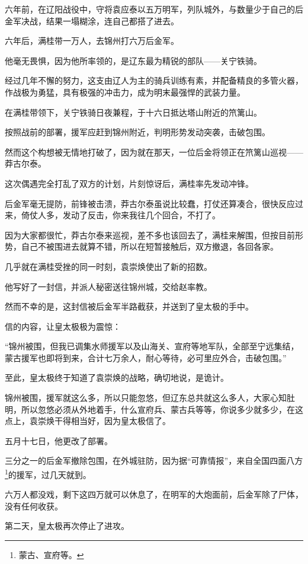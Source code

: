 \begin{multicols}{\theparacolNo}
		六年前，在辽阳战役中，守将袁应泰以五万明军，列队城外，与数量少于自己的后金军决战，结果一塌糊涂，连自己都搭了进去。

		六年后，满桂带一万人，去锦州打六万后金军。

		他毫无畏惧，因为他所率领的，是辽东最为精锐的部队——关宁铁骑。

		经过几年不懈的努力，这支由辽人为主的骑兵训练有素，并配备精良的多管火器，作战极为勇猛，具有极强的冲击力，成为明末最强悍的武装力量。

		在满桂带领下，关宁铁骑日夜兼程，于十六日抵达塔山附近的笊篱山。

		按照战前的部署，援军应赶到锦州附近，判明形势发动突袭，击破包围。

		然而这个构想被无情地打破了，因为就在那天，一位后金将领正在笊篱山巡视——莽古尔泰。

		这次偶遇完全打乱了双方的计划，片刻惊讶后，满桂率先发动冲锋。

		后金军毫无提防，前锋被击溃，莽古尔泰虽说比较蠢，打仗还算凑合，很快反应过来，倚仗人多，发动了反击，你来我往几个回合，不打了。

		因为大家都很忙，莽古尔泰来巡视，差不多也该回去了，满桂来解围，但按目前形势，自己不被围进去就算不错，所以在短暂接触后，双方撤退，各回各家。

		几乎就在满桂受挫的同一时刻，袁崇焕使出了新的招数。

		他写好了一封信，并派人秘密送往锦州城，交给赵率教。

		然而不幸的是，这封信被后金军半路截获，并送到了皇太极的手中。

		信的内容，让皇太极极为震惊：

		“锦州被围，但我已调集水师援军以及山海关、宣府等地军队，全部至宁远集结，蒙古援军也即将到来，合计七万余人，耐心等待，必可里应外合，击破包围。”

		至此，皇太极终于知道了袁崇焕的战略，确切地说，是诡计。

		锦州被围，援军就这么多，所以只能忽悠，但辽东总共就这么多人，大家心知肚明，所以忽悠必须从外地着手，什么宣府兵、蒙古兵等等，你说多少就多少，在这点上，袁崇焕干得相当好，因为皇太极信了。

		五月十七日，他更改了部署。

		三分之一的后金军撤除包围，在外城驻防，因为据“可靠情报”，来自全国四面八方\footnote{蒙古、宣府等。}的援军，过几天就到。

		六万人都没戏，剩下这四万就可以休息了，在明军的大炮面前，后金军除了尸体，没有任何收获。

		第二天，皇太极再次停止了进攻。


\end{multicols}
